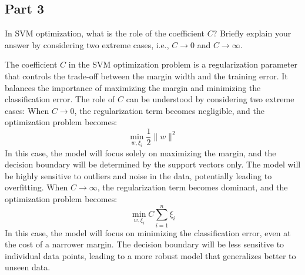\subsection{Part 3}
In SVM optimization, what is the role of the coefficient \(C\)? Briefly explain your answer by considering two extreme cases, i.e., \(C \to 0\) and \(C \to \infty\).
\begin{qsolve}
	\begin{qsolve}[]
		The coefficient \(C\) in the SVM optimization problem is a regularization parameter that controls the trade-off between the margin width and the training error. It balances the importance of maximizing the margin and minimizing the classification error. The role of \(C\) can be understood by considering two extreme cases:
		When \(C \to 0\), the regularization term becomes negligible, and the optimization problem becomes:
		\[
		\min_{w,\xi_i} \frac{1}{2} \|w\|^2
		\]
		In this case, the model will focus solely on maximizing the margin, and the decision boundary will be determined by the support vectors only.
		The model will be highly sensitive to outliers and noise in the data, potentially leading to overfitting.
		When \(C \to \infty\), the regularization term becomes dominant, and the optimization problem becomes:
		\splitqsolve[\splitqsolve]
		\[
		\min_{w,\xi_i} C \sum_{i=1}^{n} \xi_i
		\]
		In this case, the model will focus on minimizing the classification error, even at the cost of a narrower margin. The decision boundary will be less sensitive to individual data points, leading to a more robust model that generalizes better to unseen data.
	\end{qsolve}
\end{qsolve}
